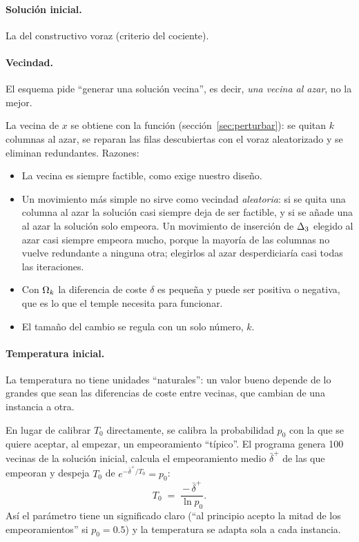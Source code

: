 \paragraph{Solución inicial.} La del constructivo voraz (criterio del cociente).

\paragraph{Vecindad.} El esquema pide ``generar una solución vecina'', es decir, \emph{una
vecina al azar}, no la mejor.

\begin{decision}
La vecina de $x$ se obtiene con la función  (sección~\ref{sec:perturbar}): se
quitan $k$ columnas al azar, se reparan las filas descubiertas con el voraz aleatorizado y se
eliminan redundantes. Razones:
\begin{itemize}[itemsep=0pt]
  \item La vecina es siempre factible, como exige nuestro diseño.
  \item Un movimiento más simple no sirve como vecindad \emph{aleatoria}: si se quita una
        columna al azar la solución casi siempre deja de ser factible, y si se añade una al
        azar la solución solo empeora. Un movimiento de inserción de $\Delta_{3}$ elegido al azar
        casi siempre empeora mucho, porque la mayoría de las columnas no vuelve redundante a
        ninguna otra; elegirlos al azar desperdiciaría casi todas las iteraciones.
  \item Con $\Omega_{k}$ la diferencia de coste $\delta$ es pequeña y puede ser positiva o
        negativa, que es lo que el temple necesita para funcionar.
  \item El tamaño del cambio se regula con un solo número, $k$.
\end{itemize}
\end{decision}

\paragraph{Temperatura inicial.} La temperatura no tiene unidades ``naturales'': un valor
bueno depende de lo grandes que sean las diferencias de coste entre vecinas, que cambian de
una instancia a otra.

\begin{decision}
En lugar de calibrar $T_0$ directamente, se calibra la probabilidad $p_0$ con la que se
quiere aceptar, al empezar, un empeoramiento ``típico''. El programa genera 100 vecinas de la
solución inicial, calcula el empeoramiento medio $\bar\delta^{+}$ de las que empeoran y
despeja $T_0$ de $e^{-\bar\delta^{+}/T_0}=p_0$:
\[
   T_0 \;=\; \frac{-\,\bar\delta^{+}}{\ln p_0}.
\]
Así el parámetro tiene un significado claro (``al principio acepto la mitad de los
empeoramientos'' si $p_0=0.5$) y la temperatura se adapta sola a cada instancia.
\end{decision}

